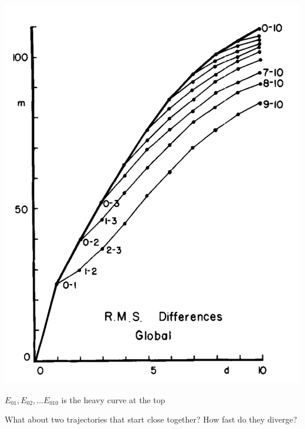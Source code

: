 \documentclass[aspectratio=169]{beamer}
\begin{document}
\begin{frame}

\begin{center}
\includegraphics[height = 0.8\textheight]{figures/lorenz_atmospheric_1982_fig1}
\end{center}

\vfill
$E_{01}, E_{02}, \ldots E_{010}$ is the heavy curve at the top

\end{frame}
\begin{frame}

What about two trajectories that start close together?  How fast do they diverge?

\end{frame}
\end{document}
